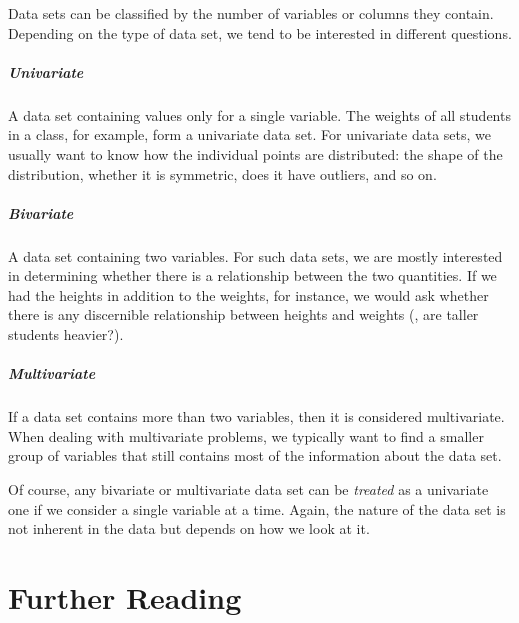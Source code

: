 Data sets can be classified by the number of variables or columns 
they contain.  Depending on the type of data set, we tend to be
interested in different questions.

\begin{unnumlist}
\subparagraph{Univariate} 
\item A data set containing values only for a single  
  variable. The weights of all students in a class, for example, form
  a univariate data set. For univariate data sets, we usually want to
  know how the individual points are distributed: the shape of the
  distribution, whether it is symmetric, does it have outliers, and so
  on.
\subparagraph{Bivariate}
\item A data set containing two variables. For such data  
  sets, we are mostly interested in determining whether there is a
  relationship between the two quantities. If we had the heights in
  addition to the weights, for instance, we would ask whether there is
  any discernible relationship between heights and weights (\eg, are
  taller students heavier?).
\subparagraph{Multivariate}
\item If a data set contains more than two variables,  
  then it is considered multivariate. When dealing with multivariate
  problems, we typically want to find a smaller group of variables
  that still contains most of the information about the data set.
\end{unnumlist}

Of course, any bivariate or multivariate data set can be
\emph{treated} as a univariate one if we consider a single variable at
a time. Again, the nature of the data set is not inherent in the data
but depends on how we look at it.


\section{Further Reading}

